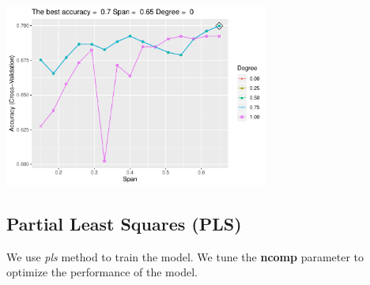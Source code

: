 \documentclass[]{article}
\newenvironment{Shaded}{\begin{snugshade}}{\end{snugshade}}
\newcommand{\CommentTok}[1]{\textcolor[rgb]{0.56,0.35,0.01}{\textit{#1}}}
\newcommand{\DataTypeTok}[1]{\textcolor[rgb]{0.13,0.29,0.53}{#1}}
\newcommand{\KeywordTok}[1]{\textcolor[rgb]{0.13,0.29,0.53}{\textbf{#1}}}
\newcommand{\NormalTok}[1]{#1}
\newcommand{\OperatorTok}[1]{\textcolor[rgb]{0.81,0.36,0.00}{\textbf{#1}}}
\newcommand{\StringTok}[1]{\textcolor[rgb]{0.31,0.60,0.02}{#1}}
\begin{document}
\begin{center}
\includegraphics[width=0.65\textwidth]{LiverDisease_files/figure-latex/unnamed-chunk-27-1.pdf}
\end{center}

\begin{Shaded}
\end{Shaded}

\subsection{Partial Least Squares (PLS)}

We use \emph{pls} method to train the model. We tune the \textbf{ncomp}
parameter to optimize the performance of the model.
\end{document}
